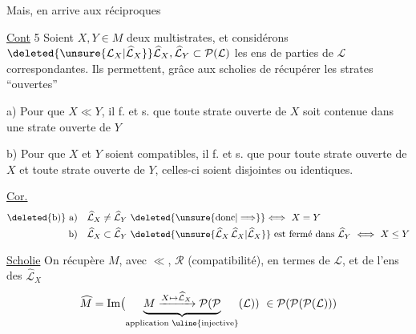 Mais,  en arrive aux réciproques


\uline{Cont} 5 Soient $X,Y\in M$ deux multistrates, et considérons $\deleted{\unsure{\mathcal{L}_X|\widehat{\mathcal{L}}_X}}\widehat{\mathcal{L}}_X,\widehat{\mathcal{L}}_Y\subset\mathcal P(\mathcal{L})$ les ens de parties de $\mathcal{L}$ correspondantes. Ils permettent, grâce aux scholies de récupérer les strates ``ouvertes''

a) Pour que $X\ll Y$, il f. et s. que  toute strate ouverte de $X$ soit contenue dans une strate ouverte de $Y$


b) Pour que $X$ et $Y$ soient compatibles, il f. et s. que pour toute strate ouverte de $X$ et toute strate ouverte de $Y$,  celles-ci soient disjointes ou identiques.

\uline{Cor.}
\[
\begin{aligned}
\text{\deleted{b)} a)}\quad &\widehat{\mathcal{L}}_X\ne\widehat{\mathcal{L}}_Y\ \deleted{\unsure{\text{donc}|\Longrightarrow}}\Longleftrightarrow\ X=Y\\
\text{b)}\quad &\widehat{\mathcal{L}}_X\subset\widehat{\mathcal{L}}_Y\ \deleted{\unsure{\widehat{\mathcal{L}}_X\,\widehat{\mathcal{L}}_X|\widehat{\mathcal{L}}_X}}\ \text{est fermé dans }\widehat{\mathcal{L}}_Y\ \Longleftrightarrow\ X\leq Y
\end{aligned}
\]

\uline{Scholie} On récupère $M$, avec $\ll$, $\mathcal R$ (compatibilité), en termes de $\mathcal{L}$, et de l'ens  des $\widehat{\mathcal{L}}_X$
\[
\widehat M=\operatorname{Im}\bigl(\underbrace{M\xrightarrow{X\mapsto\widehat{\mathcal{L}}_X}\mathcal P(\mathcal P}_{\text{application \uline{injective}}}(\mathcal{L}))\ \in\mathcal P(\mathcal P(\mathcal P(\mathcal{L})))
\]
